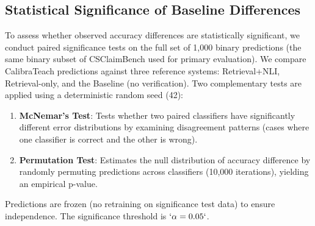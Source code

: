 \subsection{Statistical Significance of Baseline Differences}\label{statistical-significance-of-baseline-differences}

To assess whether observed accuracy differences are statistically significant, we conduct paired significance tests on the full set of 1,000 binary predictions (the same binary subset of CSClaimBench used for primary evaluation). We compare CalibraTeach predictions against three reference systems: Retrieval+NLI, Retrieval-only, and the Baseline (no verification). Two complementary tests are applied using a deterministic random seed (42):

\begin{enumerate}
\def\labelenumi{\arabic{enumi}.}
\item
  \textbf{McNemar's Test}: Tests whether two paired classifiers have significantly different error distributions by examining disagreement patterns (cases where one classifier is correct and the other is wrong).
\item
  \textbf{Permutation Test}: Estimates the null distribution of accuracy difference by randomly permuting predictions across classifiers (10,000 iterations), yielding an empirical p-value.
\end{enumerate}

Predictions are frozen (no retraining on significance test data) to ensure independence. The significance threshold is \(`\alpha = 0.05`\).

